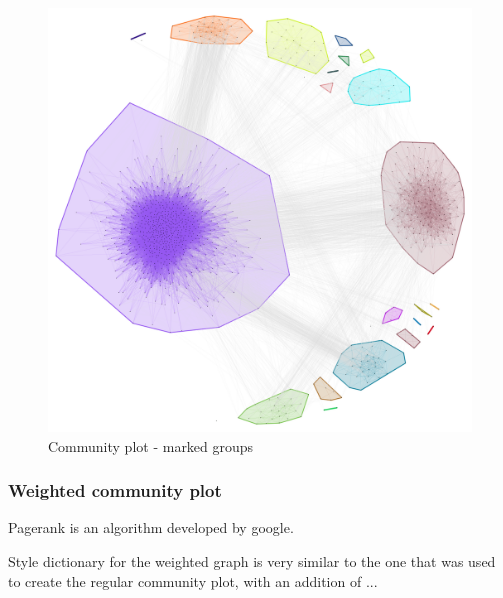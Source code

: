 \documentclass[12pt, a4paper]{article}
\begin{document}
\begin{figure}[p]
    \centering
    \includegraphics[width=\textwidth]{src/youtube/hdg_com/hdg_com_marked}
    \caption{Community plot - marked groups}
    \label{fig:hdg_com_marked}
\end{figure}

\subsubsection{Weighted community plot}

Pagerank  is an algorithm developed by google.


%

Style dictionary for the weighted graph is very similar to the one that was used to create the regular community plot, with an addition of ...


%
\end{document}
